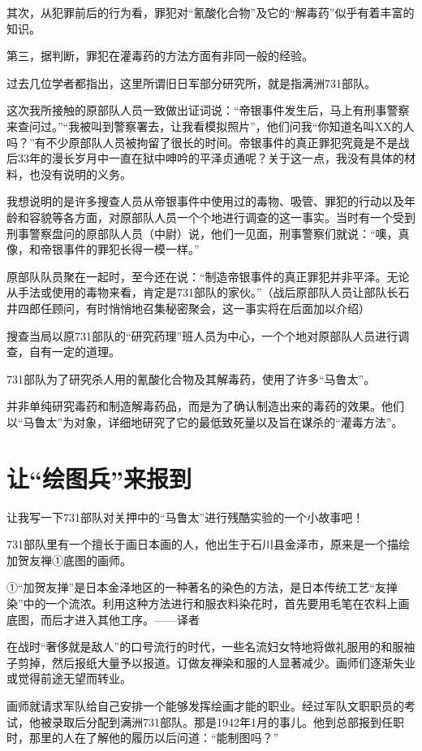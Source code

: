 \documentclass[a4paper,12pt,UTF8,twoside]{ctexbook}
\begin{document}
其次，从犯罪前后的行为看，罪犯对“氰酸化合物”及它的“解毒药”似乎有着丰富的知识。

第三，据判断，罪犯在灌毒药的方法方面有非同一般的经验。

过去几位学者都指出，这里所谓旧日军部分研究所，就是指满洲731部队。

这次我所接触的原部队人员一致做出证词说：“帝银事件发生后，马上有刑事警察来查问过。”“我被叫到警察署去，让我看模拟照片”，他们问我“你知道名叫XX的人吗？”有不少原部队人员被拘留了很长的时间。帝银事件的真正罪犯究竟是不是战后33年的漫长岁月中一直在狱中呻吟的平泽贞通呢？关于这一点，我没有具体的材料，也没有说明的义务。

我想说明的是许多搜查人员从帝银事件中使用过的毒物、吸管、罪犯的行动以及年龄和容貌等各方面，对原部队人员一个个地进行调查的这一事实。当时有一个受到刑事警察盘问的原部队人员（中尉）说，他们一见面，刑事警察们就说：“噢，真像，和帝银事件的罪犯长得一模一样。”

原部队队员聚在一起时，至今还在说：“制造帝银事件的真正罪犯并非平泽。无论从手法或使用的毒物来看，肯定是731部队的家伙。”（战后原部队人员让部队长石井四郎任顾问，有时悄悄地召集秘密聚会，这一事实将在后面加以介绍）

搜查当局以原731部队的“研究药理”班人员为中心，一个个地对原部队人员进行调查，自有一定的道理。

731部队为了研究杀人用的氰酸化合物及其解毒药，使用了许多“马鲁太”。

并非单纯研究毒药和制造解毒药品，而是为了确认制造出来的毒药的效果。他们以“马鲁太”为对象，详细地研究了它的最低致死量以及旨在谋杀的“灌毒方法”。

\section{让“绘图兵”来报到}

让我写一下731部队对关押中的“马鲁太”进行残酷实验的一个小故事吧！

731部队里有一个擅长于画日本画的人，他出生于石川县金泽市，原来是一个描绘加贺友禅①底图的画师。

①“加贺友掸”是日本金泽地区的一种著名的染色的方法，是日本传统工艺“友掸染”中的一个流浓。利用这种方法进行和服衣料染花时，首先要用毛笔在农料上画底图，而后才进入其他工序。——译者

在战时“奢侈就是敌人”的口号流行的时代，一些名流妇女特地将做礼服用的和服袖子剪掉，然后报纸大量予以报道。订做友禅染和服的人显著减少。画师们逐渐失业或觉得前途无望而转业。

画师就请求军队给自己安排一个能够发挥绘画才能的职业。经过军队文职职员的考试，他被录取后分配到满洲731部队。那是1942年1月的事儿。他到总部报到任职时，那里的人在了解他的履历以后问道：“能制图吗？”
\end{document}
